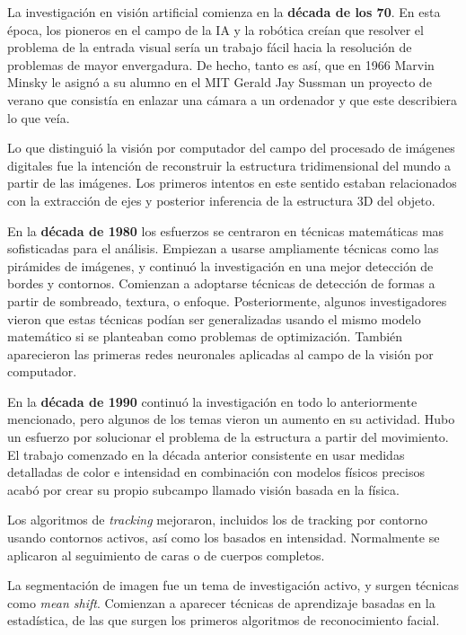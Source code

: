 La investigación en visión artificial comienza en la \textbf{década de los 70}. En esta época, los pioneros en el campo de la IA y la robótica creían que resolver el problema de la entrada visual sería un trabajo fácil hacia la resolución de problemas de mayor envergadura. De hecho, tanto es así, que en 1966 Marvin Minsky le asignó a su alumno en el MIT Gerald Jay Sussman un proyecto de verano que consistía en enlazar una cámara a un ordenador y que este describiera lo que veía.

Lo que distinguió la visión por computador del campo del procesado de imágenes digitales fue la intención de reconstruir la estructura tridimensional del mundo a partir de las imágenes. Los primeros intentos en este sentido estaban relacionados con la extracción de ejes y posterior inferencia de la estructura 3D del objeto.

En la \textbf{década de 1980} los esfuerzos se centraron en técnicas matemáticas mas sofisticadas para el análisis. Empiezan a usarse ampliamente técnicas como las pirámides de imágenes, y continuó la investigación en una mejor detección de bordes y contornos. Comienzan a adoptarse técnicas de detección de formas a partir de sombreado, textura, o enfoque. Posteriormente, algunos investigadores vieron que estas técnicas podían ser generalizadas usando el mismo modelo matemático si se planteaban como problemas de optimización. También aparecieron las primeras redes neuronales aplicadas al campo de la visión por computador.

En la \textbf{década de 1990} continuó la investigación en todo lo anteriormente mencionado, pero algunos de los temas vieron un aumento en su actividad. Hubo un esfuerzo por solucionar el problema de la estructura a partir del movimiento. El trabajo comenzado en la década anterior consistente en usar medidas detalladas de color e intensidad en combinación con modelos físicos precisos acabó por crear su propio subcampo llamado visión basada en la física.

Los algoritmos de \textit{tracking} mejoraron, incluidos los de tracking por contorno usando contornos activos, así como los basados en intensidad. Normalmente se aplicaron al seguimiento de caras o de cuerpos completos.

La segmentación de imagen fue un tema de investigación activo, y surgen técnicas como \textit{mean shift}. Comienzan a aparecer técnicas de aprendizaje basadas en la estadística, de las que surgen los primeros algoritmos de reconocimiento facial.

